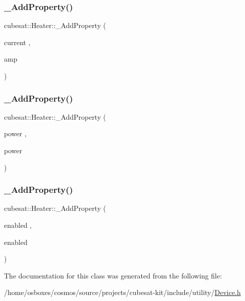 \mbox{\label{classcubesat_1_1Heater_a0ed9b05c35f70645dcbb759d221553b6}} 
\subsubsection{\texorpdfstring{\+\_\+\+Add\+Property()}{\_AddProperty()}\hspace{0.1cm}{\footnotesize\ttfamily [3/5]}}
{\footnotesize\ttfamily cubesat\+::\+Heater\+::\+\_\+\+Add\+Property (\begin{DoxyParamCaption}\item[{current}]{,  }\item[{amp}]{ }\end{DoxyParamCaption})}

\mbox{\label{classcubesat_1_1Heater_a0fc3d2d1e7be729233941badd87132dc}} 
\subsubsection{\texorpdfstring{\+\_\+\+Add\+Property()}{\_AddProperty()}\hspace{0.1cm}{\footnotesize\ttfamily [4/5]}}
{\footnotesize\ttfamily cubesat\+::\+Heater\+::\+\_\+\+Add\+Property (\begin{DoxyParamCaption}\item[{power}]{,  }\item[{power}]{ }\end{DoxyParamCaption})}

\mbox{\label{classcubesat_1_1Heater_aec846009881794b1594b21544730e52e}} 
\subsubsection{\texorpdfstring{\+\_\+\+Add\+Property()}{\_AddProperty()}\hspace{0.1cm}{\footnotesize\ttfamily [5/5]}}
{\footnotesize\ttfamily cubesat\+::\+Heater\+::\+\_\+\+Add\+Property (\begin{DoxyParamCaption}\item[{enabled}]{,  }\item[{enabled}]{ }\end{DoxyParamCaption})}



The documentation for this class was generated from the following file\+:\begin{DoxyCompactItemize}
\item 
/home/osboxes/cosmos/source/projects/cubesat-\/kit/include/utility/\hyperlink{Device_8h}{Device.\+h}\end{DoxyCompactItemize}
